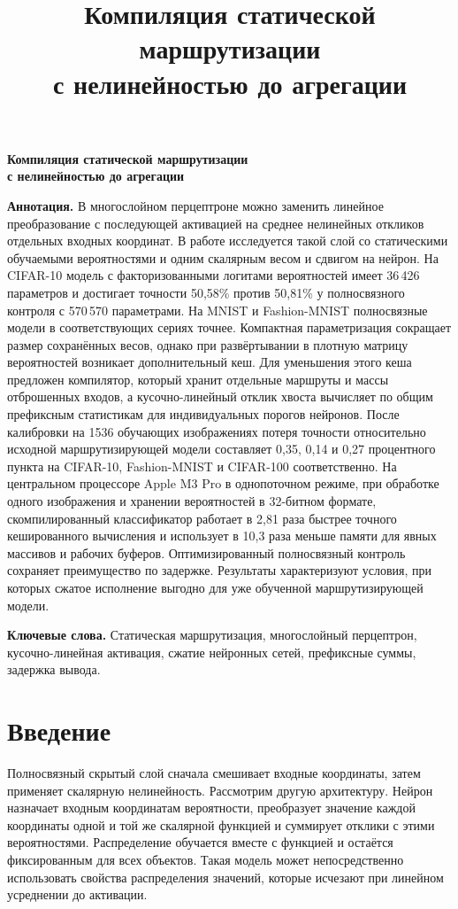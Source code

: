 \documentclass[11pt,a4paper]{article}
\title{Компиляция статической маршрутизации\\с нелинейностью до агрегации}
\date{}
\newcommand{\AuthorName}{}
\newcommand{\AuthorAffiliation}{}
\begin{document}
\begin{center}
{\LARGE\bfseries Компиляция статической маршрутизации\\[3pt] с нелинейностью до агрегации\par}
\ifx\AuthorName\empty\else
\vspace{5pt}\AuthorName\par\AuthorAffiliation\par
\fi
\end{center}
\smallskip
\noindent\textbf{Аннотация.}
В многослойном перцептроне можно заменить линейное преобразование с последующей активацией на среднее нелинейных откликов отдельных входных координат. В работе исследуется такой слой со статическими обучаемыми вероятностями и одним скалярным весом и сдвигом на нейрон. На CIFAR-10 модель с факторизованными логитами вероятностей имеет 36\,426 параметров и достигает точности 50,58\% против 50,81\% у полносвязного контроля с 570\,570 параметрами. На MNIST и Fashion-MNIST полносвязные модели в соответствующих сериях точнее. Компактная параметризация сокращает размер сохранённых весов, однако при развёртывании в плотную матрицу вероятностей возникает дополнительный кеш. Для уменьшения этого кеша предложен компилятор, который хранит отдельные маршруты и массы отброшенных входов, а кусочно-линейный отклик хвоста вычисляет по общим префиксным статистикам для индивидуальных порогов нейронов. После калибровки на 1536 обучающих изображениях потеря точности относительно исходной маршрутизирующей модели составляет 0,35, 0,14 и 0,27 процентного пункта на CIFAR-10, Fashion-MNIST и CIFAR-100 соответственно. На центральном процессоре Apple M3 Pro в однопоточном режиме, при обработке одного изображения и хранении вероятностей в 32-битном формате, скомпилированный классификатор работает в 2,81 раза быстрее точного кешированного вычисления и использует в 10,3 раза меньше памяти для явных массивов и рабочих буферов. Оптимизированный полносвязный контроль сохраняет преимущество по задержке. Результаты характеризуют условия, при которых сжатое исполнение выгодно для уже обученной маршрутизирующей модели.

\smallskip
{\raggedright\noindent\textbf{Ключевые слова.} Статическая маршрутизация, многослойный перцептрон, кусочно-линейная активация, сжатие нейронных сетей, префиксные суммы, задержка вывода.\par}

\section{Введение}
Полносвязный скрытый слой сначала смешивает входные координаты, затем применяет скалярную нелинейность. Рассмотрим другую архитектуру. Нейрон назначает входным координатам вероятности, преобразует значение каждой координаты одной и той же скалярной функцией и суммирует отклики с этими вероятностями. Распределение обучается вместе с функцией и остаётся фиксированным для всех объектов. Такая модель может непосредственно использовать свойства распределения значений, которые исчезают при линейном усреднении до активации.
\end{document}
